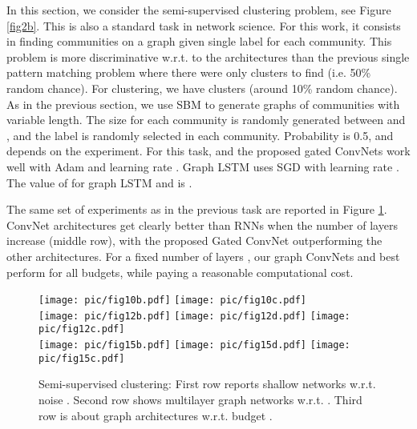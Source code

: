 \documentclass{article} \usepackage{iclr2018_conference,times}
\begin{document}
In this section, we consider the semi-supervised clustering problem, see Figure  \ref{fig2b}. This is also a standard task in network science. For this work, it consists in finding  communities on a graph given  single label for each community. This problem is more discriminative w.r.t. to the architectures than the previous single pattern matching problem where there were only  clusters to find (i.e. 50\% random chance). For clustering, we have  clusters (around 10\% random chance). As in the previous section, we use SBM to generate graphs of communities with variable length. The size for each community is randomly generated between  and , and the label is randomly selected in each community. Probability  is 0.5, and  depends on the experiment. For this task, \cite{art:LiTarlowBrockschmidtZemel16GNN,art:SukhbaatarSzlamFergus16ComAgents,marcheggiani2017encoding} and the proposed gated ConvNets work well with Adam and learning rate . Graph LSTM uses SGD with learning rate . The value of  for graph LSTM and \cite{art:LiTarlowBrockschmidtZemel16GNN} is .

The same set of experiments as in the previous task are reported in Figure \ref{fig_clustering}. ConvNet architectures get clearly better than RNNs when the number of layers increase (middle row), with the proposed Gated ConvNet outperforming the other architectures. For a fixed number of layers , our graph ConvNets and \cite{marcheggiani2017encoding} best perform for all budgets, while paying a reasonable computational cost.
\begin{figure}[h!]
\centering
\hspace{-0.53cm}
\texttt{[image: pic/fig10b.pdf]}
\hspace{-0.53cm}
\texttt{[image: pic/fig10c.pdf]}\\
\texttt{[image: pic/fig12b.pdf]}
\hspace{-0.53cm}
\texttt{[image: pic/fig12d.pdf]}
\hspace{-0.53cm}
\texttt{[image: pic/fig12c.pdf]}\\
\texttt{[image: pic/fig15b.pdf]}
\hspace{-0.53cm}
\texttt{[image: pic/fig15d.pdf]}
\hspace{-0.53cm}
\texttt{[image: pic/fig15c.pdf]}
\caption{Semi-supervised clustering: First row reports shallow networks w.r.t. noise . Second row shows multilayer graph networks w.r.t. . Third row is about graph architectures w.r.t. budget .}
\label{fig_clustering}
\end{figure}
\end{document}
